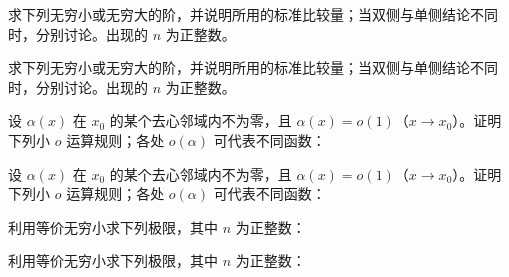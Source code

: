 \noindent\begin{minipage}{\textwidth}
求下列无穷小或无穷大的阶，并说明所用的标准比较量；当双侧与单侧结论不同时，分别讨论。出现的 $n$ 为正整数。
\end{minipage}\par\vfill
\noindent\begin{minipage}{\textwidth}
求下列无穷小或无穷大的阶，并说明所用的标准比较量；当双侧与单侧结论不同时，分别讨论。出现的 $n$ 为正整数。
\end{minipage}\par\vfill
\newpage
\noindent\begin{minipage}{\textwidth}
设 $\alpha(x)$ 在 $x_0$ 的某个去心邻域内不为零，且 $\alpha(x)=o(1)$（$x\to x_0$）。证明下列小 $o$ 运算规则；各处 $o(\alpha)$ 可代表不同函数：
\end{minipage}\par\vfill
\noindent\begin{minipage}{\textwidth}
设 $\alpha(x)$ 在 $x_0$ 的某个去心邻域内不为零，且 $\alpha(x)=o(1)$（$x\to x_0$）。证明下列小 $o$ 运算规则；各处 $o(\alpha)$ 可代表不同函数：
\end{minipage}\par\vfill
\noindent\begin{minipage}{\textwidth}
利用等价无穷小求下列极限，其中 $n$ 为正整数：
\end{minipage}\par\vfill
\newpage
\noindent\begin{minipage}{\textwidth}
利用等价无穷小求下列极限，其中 $n$ 为正整数：
\end{minipage}\par\vfill
